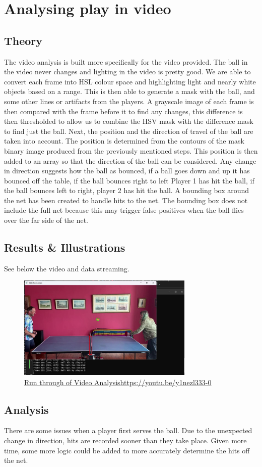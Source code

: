 \section{Analysing play in video}
\subsection{Theory}
The video analysis is built more specifically for the video provided. The ball in the video never changes and lighting in the video is pretty good. We are able to convert each frame into HSL colour space and highlighting light and nearly white objects based on a range. This is then able to generate a mask with the ball, and some other lines or artifacts from the players. A grayscale image of each frame is then compared with the frame before it to find any changes, this difference is then thresholded to allow us to combine the HSV mask with the difference mask to find just the ball. Next, the position and the direction of travel of the ball are taken into account. The position is determined from the contours of the mask binary image produced from the previously mentioned steps. This position is then added to an array so that the direction of the ball can be considered. Any change in direction suggests how the ball as bounced, if a ball goes down and up it has bounced off the table, if the ball bounces right to left Player 1 has hit the ball, if the ball bounces left to right, player 2 has hit the ball. A bounding box around the net has been created to handle hits to the net. The bounding box does not include the full net because this may trigger false positives when the ball flies over the far side of the net. 
\subsection{Results \& Illustrations}
See below the video and data streaming.
\begin{figure}[H]
    \centering
    \includegraphics[width=0.75\textwidth]{results/frame.jpg}
    \caption{\href{https://youtu.be/y1nezl333-0}{Run through of Video Analysis}\href{https://youtu.be/y1nezl333-0}{https://youtu.be/y1nezl333-0}}
    \label{fig:vid-anyl}
\end{figure}

\subsection{Analysis}
There are some issues when a player first serves the ball. Due to the unexpected change in direction, hits are recorded sooner than they take place. Given more time, some more logic could be added to more accurately determine the hits off the net.